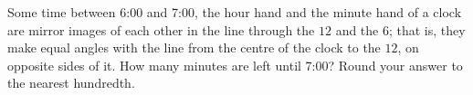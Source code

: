 Some time between 6:00 and 7:00, the hour hand and the minute hand of a clock are mirror images of each other in the line through the $12$ and the $6$; that is, they make equal angles with the line from the centre of the clock to the $12$, on opposite sides of it. How many minutes are left until 7:00? Round your answer to the nearest hundredth.
